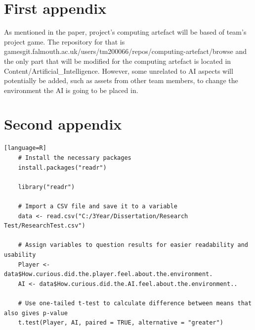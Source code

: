 \documentclass[journal]{IEEEtran}
\begin{document}





\appendices
\section{First appendix}
\label{appendix:a}
As mentioned in the paper, project's computing artefact will be based of team's project game. The repository for that is gamesgit.falmouth.ac.uk/users/tm200066/repos/computing-artefact/browse and the only part that will be modified for the computing artefact is located in Content/Artificial\_Intelligence. However, some unrelated to AI aspects will potentially be added, such as assets from other team members, to change the environment the AI is going to be placed in.

\newpage

\section{Second appendix}
\label{appendix:b}
\begin{lstlisting}[frame=single, breaklines=true][language=R]
	# Install the necessary packages
	install.packages("readr")

	library("readr")

	# Import a CSV file and save it to a variable
	data <- read.csv("C:/3Year/Dissertation/Research Test/ResearchTest.csv")

	# Assign variables to question results for easier readability and usability
	Player <- data$How.curious.did.the.player.feel.about.the.environment.
	AI <- data$How.curious.did.the.AI.feel.about.the.environment..

	# Use one-tailed t-test to calculate difference between means that also gives p-value
	t.test(Player, AI, paired = TRUE, alternative = "greater")
\end{lstlisting}


\end{document}
